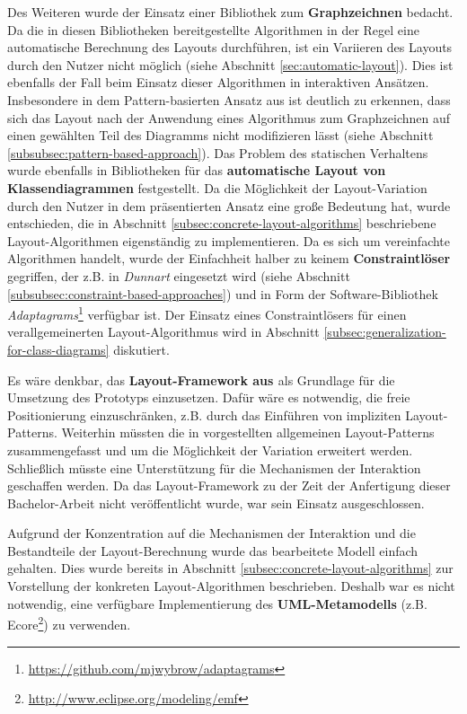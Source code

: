 Des Weiteren wurde der Einsatz einer Bibliothek zum \textbf{Graphzeichnen} bedacht. Da die in diesen Bibliotheken bereitgestellte Algorithmen in der Regel eine automatische Berechnung des Layouts durchführen, ist ein Variieren des Layouts durch den Nutzer nicht möglich (siehe Abschnitt \ref{sec:automatic-layout}). Dies ist ebenfalls der Fall beim Einsatz dieser Algorithmen in interaktiven Ansätzen. Insbesondere in dem Pattern-basierten Ansatz aus \cite{Maier12A-Pattern-based} ist deutlich zu erkennen, dass sich das Layout nach der Anwendung eines Algorithmus zum Graphzeichnen auf einen gewählten Teil des Diagramms nicht modifizieren lässt (siehe Abschnitt \ref{subsubsec:pattern-based-approach}). Das Problem des statischen Verhaltens wurde ebenfalls in Bibliotheken für das \textbf{automatische Layout von Klassendiagrammen} festgestellt. Da die Möglichkeit der Layout-Variation durch den Nutzer in dem präsentierten Ansatz eine große Bedeutung hat, wurde entschieden, die in Abschnitt \ref{subsec:concrete-layout-algorithms} beschriebene Layout-Algorithmen eigenständig zu implementieren. Da es sich um vereinfachte Algorithmen handelt, wurde der Einfachheit halber zu keinem \textbf{Constraintlöser} gegriffen, der z.B. in \textit{Dunnart} eingesetzt wird (siehe Abschnitt \ref{subsubsec:constraint-based-approaches}) und in Form der Software-Bibliothek \textit{Adaptagrams}\footnote{\url{https://github.com/mjwybrow/adaptagrams}} verfügbar ist. Der Einsatz eines Constraintlösers für einen verallgemeinerten Layout-Algorithmus wird in Abschnitt \ref{subsec:generalization-for-class-diagrams} diskutiert.

Es wäre denkbar, das \textbf{Layout-Framework aus \cite{Maier12A-Pattern-based}} als Grundlage für die Umsetzung des Prototyps einzusetzen. Dafür wäre es notwendig, die freie Positionierung einzuschränken, z.B. durch das Einführen von impliziten Layout-Patterns. Weiterhin müssten die in \cite{Maier12A-Pattern-based} vorgestellten allgemeinen Layout-Patterns zusammengefasst und um die Möglichkeit der Variation erweitert werden. Schließlich müsste eine Unterstützung für die Mechanismen der Interaktion geschaffen werden. Da das Layout-Framework zu der Zeit der Anfertigung dieser Bachelor-Arbeit nicht veröffentlicht wurde, war sein Einsatz ausgeschlossen.

Aufgrund der Konzentration auf die Mechanismen der Interaktion und die Bestandteile der Layout-Berechnung wurde das bearbeitete Modell einfach gehalten. Dies wurde bereits in Abschnitt \ref{subsec:concrete-layout-algorithms} zur Vorstellung der konkreten Layout-Algorithmen beschrieben. Deshalb war es nicht notwendig, eine verfügbare Implementierung des \textbf{UML-Metamodells} (z.B. Ecore\footnote{\url{http://www.eclipse.org/modeling/emf}}) zu verwenden.

